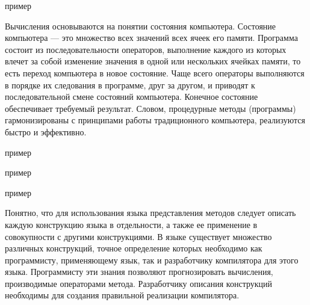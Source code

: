 \begin{itemize}
\begin{SCn}
\begin{scnhaselementrolelist}{пример}
\end{scnhaselementrolelist}
\end{SCn}

Вычисления основываются на понятии состояния компьютера. Состояние компьютера — это множество всех значений всех ячеек
его памяти. Программа состоит из последовательности операторов, выполнение каждого из которых влечет за собой изменение
значения в одной или нескольких ячейках памяти, то есть переход компьютера в новое состояние.
Чаще всего операторы выполняются в порядке их следования в программе, друг за другом, и приводят к последовательной
смене состояний компьютера. Конечное состояние обеспечивает требуемый результат. Словом, процедурные методы (программы)
гармонизированы с принципами работы традиционного компьютера, реализуются быстро и эффективно.

\begin{SCn}
\begin{scnhaselementrolelist}{пример}
\end{scnhaselementrolelist}
\end{SCn}

\begin{SCn}
\begin{scnhaselementrolelist}{пример}
    \scnitem{}
\end{scnhaselementrolelist}
\end{SCn}

\begin{SCn}
\begin{scnhaselementrolelist}{пример}
\end{scnhaselementrolelist}
\end{SCn}

Понятно, что для использования языка представления методов следует описать каждую конструкцию языка в отдельности, а
также ее применение в совокупности с другими конструкциями. В языке существует множество различных конструкций, точное
определение которых необходимо как программисту, применяющему язык, так и разработчику компилятора для этого
языка. Программисту эти знания позволяют прогнозировать вычисления, производимые операторами метода. Разработчику
описания конструкций необходимы для создания правильной реализации компилятора.


\end{itemize}

